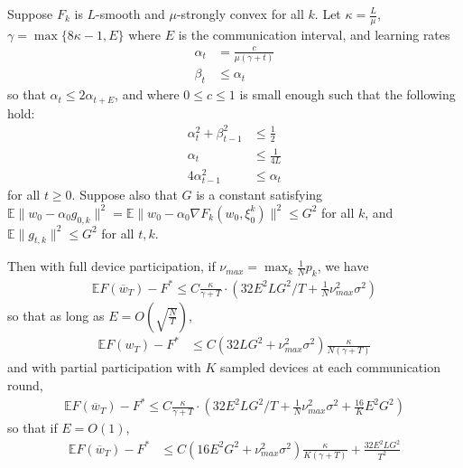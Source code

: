 \begin{theorem}
	Suppose $F_{k}$ is $L$-smooth and $\mu$-strongly convex for all
	$k$. Let $\kappa=\frac{L}{\mu}$, $\gamma=\max\{8\kappa-1,E\}$ where
	$E$ is the communication interval, and learning rates 
	\begin{align*}
	\alpha_{t} & =\frac{c}{\mu(\gamma+t)}\\
	\beta_{t} & \leq\alpha_{t}
	\end{align*}
	so that $\alpha_{t}\leq2\alpha_{t+E}$, and where $0\leq c\leq1$
	is small enough such that the following hold: 
	\begin{align*}
	\alpha_{t}^{2}+\beta_{t-1}^{2} & \leq\frac{1}{2}\\
	\alpha_{t} & \leq\frac{1}{4L}\\
	4\alpha_{t-1}^{2} & \leq\alpha_{t}
	\end{align*}
	for all $t\geq0$. Suppose also that $G$ is a constant satisfying
	$\mathbb{E}\|w_{0}-\alpha_{0}g_{0,k}\|^{2}=\mathbb{E}\|w_{0}-\alpha_{0}\nabla F_{k}(w_{0},\xi_{0}^{k})\|^{2}\leq G^{2}$
	for all $k$, and $\mathbb{E}\|g_{t,k}\|^{2}\leq G^{2}$ for all $t,k$. 
	
	Then with full device participation, if $\nu_{max}=\max_{k}\frac{1}{N}p_{k}$,
	we have 
	\begin{align*}
	\mathbb{E}F(\overline{w}_{T})-F^{\ast}\leq C\frac{\kappa}{\gamma+T}\cdot(32E^{2}LG^{2}/T+\frac{1}{N}\nu_{max}^{2}\sigma^{2})
	\end{align*}
	so that as long as $E=O(\sqrt{\frac{N}{T}})$, 
	\begin{align*}
	\mathbb{E}F(w_{T})-F^{\ast} & \leq C(32LG^{2}+\nu_{max}^{2}\sigma^{2})\frac{\kappa}{N(\gamma+T)}
	\end{align*}
	and with partial participation with $K$ sampled devices at each
	communication round, 
	\begin{align*}
	\mathbb{E}F(\overline{w}_{T})-F^{\ast}\leq C\frac{\kappa}{\gamma+T}\cdot(32E^{2}LG^{2}/T+\frac{1}{N}\nu_{max}^{2}\sigma^{2}+\frac{16}{K}E^{2}G^{2})
	\end{align*}
	so that if $E=O(1)$, 
	\begin{align*}
	\mathbb{E}F(\overline{w}_{T})-F^{\ast} & \leq C(16E^{2}G^{2}+\nu_{max}^{2}\sigma^{2})\frac{\kappa}{K(\gamma+T)}+\frac{32E^{2}LG^{2}}{T^{2}}
	\end{align*}
\end{theorem}